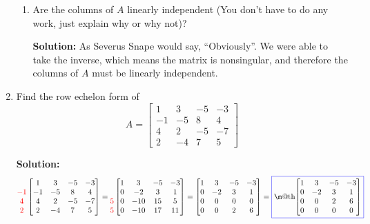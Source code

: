 \documentclass[14pt]{amsart}
\makeatletter
\newcommand{\?}{\stackrel{?}{=}}
\newcommand*{\boxedcolor}{blue}
\renewcommand{\boxed}[1]{\textcolor{\boxedcolor}{%
  \fbox{\normalcolor\m@th$\displaystyle#1$}}}
\makeatother
\begin{document}
\begin{enumerate}
\begin{enumerate}
\item  Are the columns of $A$ linearly independent (You don't have to do any work, just explain why or why not)?

\textbf{Solution:  }  As Severus Snape would say, ``Obviously''.  We were able to take the inverse, which means the
matrix is nonsingular, and therefore the columns of $A$ must be linearly independent.

\end{enumerate}

\pagebreak

\item  Find the row echelon form of
%
\begin{equation*}
A = \begin{bmatrix}
1 & 3 & -5 & -3\\
-1 & -5 & 8 & 4\\
4 & 2 & -5 & -7\\
2 & -4 & 7 & 5
\end{bmatrix}
\end{equation*}

\textbf{Solution:  }  
%
\begin{align*}
\begin{matrix}
\\
{\color{red}-1}\\
{\color{red}4}\\
{\color{red}2}
\end{matrix}\begin{bmatrix}
1 & 3 & -5 & -3\\
-1 & -5 & 8 & 4\\
4 & 2 & -5 & -7\\
2 & -4 & 7 & 5
\end{bmatrix} = \begin{matrix}
\\
\\
{\color{red}5}\\
{\color{red}5}
\end{matrix}\begin{bmatrix}
1 & 3 & -5 & -3\\
0 & -2 & 3 & 1\\
0 & -10 & 15 & 5\\
0 & -10 & 17 & 11
\end{bmatrix} = \begin{bmatrix}
1 & 3 & -5 & -3\\
0 & -2 & 3 & 1\\
0 & 0 & 0 & 0\\
0 & 0 & 2 & 6
\end{bmatrix} = \boxed{\begin{bmatrix}
1 & 3 & -5 & -3\\
0 & -2 & 3 & 1\\
0 & 0 & 2 & 6\\
0 & 0 & 0 & 0
\end{bmatrix}}
\end{align*}


\end{enumerate}
\end{document}
